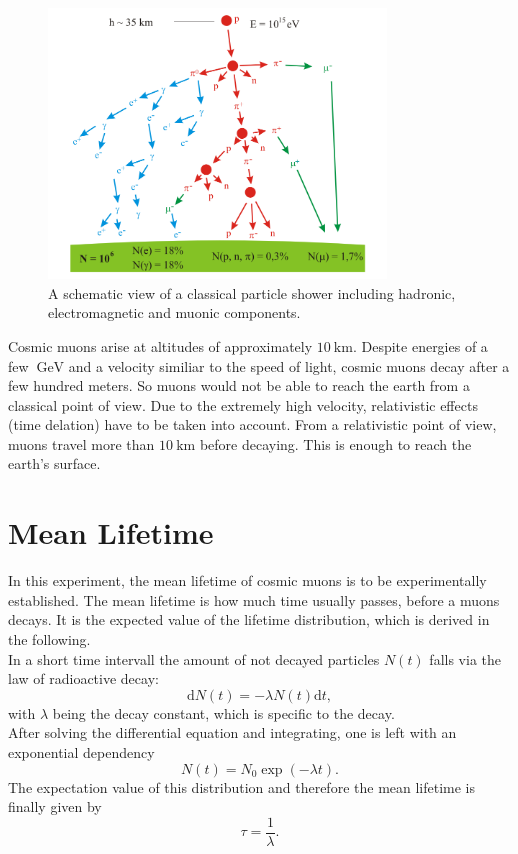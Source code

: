 \begin{figure}
    \centering
    \includegraphics[width = 0.8\textwidth]{pics/Teilchenkaskade.png}
    \caption{A schematic view of a classical particle shower including hadronic, electromagnetic and muonic components. \cite{WikiKaskade}}
    \label{fig:Teilchenshower}
\end{figure}
Cosmic muons arise at altitudes of approximately $\qty{10}{\kilo\meter}$\cite{MyonenAachen}. Despite energies of a few $\qty{}{\giga\electronvolt}$ and a velocity similiar to the speed of light, cosmic 
muons decay after a few hundred meters. So muons would not be able to reach the earth from a classical point of view. Due to the extremely high velocity, relativistic effects (time delation) have to be taken into account.
From a relativistic point of view, muons travel more than $\qty{10}{\kilo\meter}$ before decaying. This is enough to reach the earth's surface.\\

\section{Mean Lifetime}
In this experiment, the mean lifetime of cosmic muons is to be experimentally established. The mean lifetime is how much time usually passes, before a muons decays. It is the expected value of the 
lifetime distribution, which is derived in the following.\\
In a short time intervall the amount of not decayed particles $N(t)$ falls via the law of radioactive decay:
\begin{equation}
    \mathrm{d}N(t) = - \lambda N(t) \mathrm{d}t,
\end{equation}
with $\lambda$ being the decay constant, which is specific to the decay.\\
After solving the differential equation and integrating, one is left with an exponential dependency
\begin{equation}
    N(t) = N_0 \exp{(-\lambda t)}.
\end{equation}
The expectation value of this distribution and therefore the mean lifetime is finally given by
\begin{equation}
    \tau = \frac{1}{\lambda}.
\end{equation}

